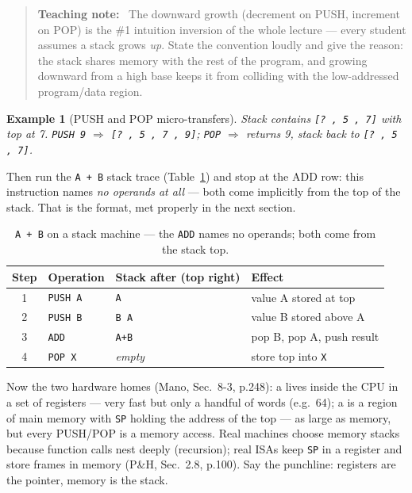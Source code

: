 \documentclass[11pt]{article}
\newtheorem{example}{Example}[section]
\newenvironment{teachingaside}{\begin{quote}\small\color{primary-gold}\textbf{Teaching note:}\ }{\end{quote}}
\begin{document}
\begin{teachingaside}
The downward growth (decrement on PUSH, increment on POP) is the \#1 intuition inversion of the whole lecture --- every student assumes a stack grows \emph{up}. State the convention loudly and give the reason: the stack shares memory with the rest of the program, and growing downward from a high base keeps it from colliding with the low-addressed program/data region.
\end{teachingaside}

\begin{example}[PUSH and POP micro-transfers]
Stack contains \texttt{[? , 5 , 7]} with top at 7. \texttt{PUSH 9} $\Rightarrow$ \texttt{[? , 5 , 7 , 9]}; \texttt{POP} $\Rightarrow$ returns 9, stack back to \texttt{[? , 5 , 7]}.
\end{example}

Then run the \texttt{A + B} stack trace (Table~\ref{tab:stack-add}) and stop at the ADD row: this instruction names \emph{no operands at all} --- both come implicitly from the top of the stack. That is the  format, met properly in the next section.

\begin{table}[h]
\centering
\small
\begin{tabular}{@{}clp{4.2cm}p{4.2cm}@{}}
\toprule
\textbf{Step} & \textbf{Operation} & \textbf{Stack after (top right)} & \textbf{Effect} \\
\midrule
1 & \texttt{PUSH A} & \texttt{A} & value A stored at top \\
2 & \texttt{PUSH B} & \texttt{B A} & value B stored above A \\
3 & \texttt{ADD}    & \texttt{A+B} & pop B, pop A, push result \\
4 & \texttt{POP X}  & \emph{empty} & store top into \texttt{X} \\
\bottomrule
\end{tabular}
\caption{\texttt{A + B} on a stack machine --- the \texttt{ADD} names no operands; both come from the stack top.}
\label{tab:stack-add}
\end{table}

Now the two hardware homes (Mano, Sec.~8-3, p.248): a  lives inside the CPU in a set of registers --- very fast but only a handful of words (e.g.\ 64); a  is a region of main memory with \texttt{SP} holding the address of the top --- as large as memory, but every PUSH/POP is a memory access. Real machines choose memory stacks because function calls nest deeply (recursion); real ISAs keep \texttt{SP} in a register and store frames in memory (P\&H, Sec.~2.8, p.100). Say the punchline: registers are the pointer, memory is the stack.
\end{document}
